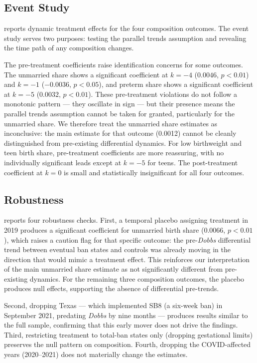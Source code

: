 \documentclass[12pt]{article}
\begin{document}



\subsection{Event Study}

 reports dynamic treatment effects for the four composition outcomes. The event study serves two purposes: testing the parallel trends assumption and revealing the time path of any composition changes.

The pre-treatment coefficients raise identification concerns for some outcomes. The unmarried share shows a significant coefficient at $k = -4$ ($0.0046$, $p < 0.01$) and $k = -1$ ($-0.0036$, $p < 0.05$), and preterm share shows a significant coefficient at $k = -5$ ($0.0032$, $p < 0.01$). These pre-treatment violations do not follow a monotonic pattern --- they oscillate in sign --- but their presence means the parallel trends assumption cannot be taken for granted, particularly for the unmarried share. We therefore treat the unmarried share estimates as inconclusive: the main estimate for that outcome (0.0012) cannot be cleanly distinguished from pre-existing differential dynamics. For low birthweight and teen birth share, pre-treatment coefficients are more reassuring, with no individually significant leads except at $k = -5$ for teens. The post-treatment coefficient at $k = 0$ is small and statistically insignificant for all four outcomes.




\subsection{Robustness}

 reports four robustness checks. First, a temporal placebo assigning treatment in 2019 produces a significant coefficient for unmarried birth share ($0.0066$, $p < 0.01$), which raises a caution flag for that specific outcome: the pre-\emph{Dobbs} differential trend between eventual ban states and controls was already moving in the direction that would mimic a treatment effect. This reinforces our interpretation of the main unmarried share estimate as not significantly different from pre-existing dynamics. For the remaining three composition outcomes, the placebo produces null effects, supporting the absence of differential pre-trends.

Second, dropping Texas --- which implemented SB8 (a six-week ban) in September 2021, predating \emph{Dobbs} by nine months --- produces results similar to the full sample, confirming that this early mover does not drive the findings. Third, restricting treatment to total-ban states only (dropping gestational limits) preserves the null pattern on composition. Fourth, dropping the COVID-affected years (2020--2021) does not materially change the estimates.
\end{document}
